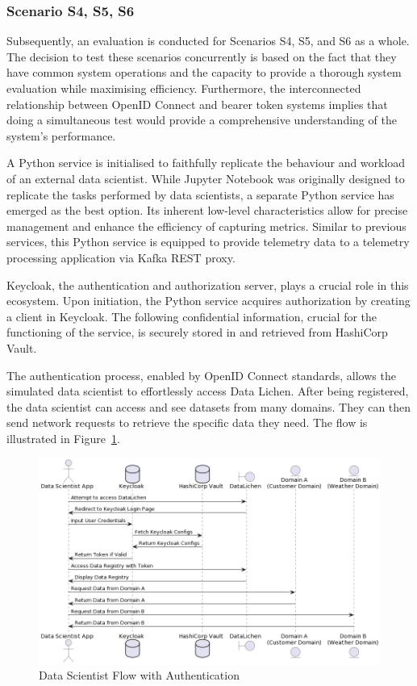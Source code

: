\documentclass[journal]{IEEEtran}
\begin{document}
\subsubsection{Scenario S4, S5, S6}

Subsequently, an evaluation is conducted for Scenarios S4, S5, and S6 as a whole. The decision to test these scenarios concurrently is based on the fact that they have common system operations and the capacity to provide a thorough system evaluation while maximising efficiency. Furthermore, the interconnected relationship between OpenID Connect and bearer token systems implies that doing a simultaneous test would provide a comprehensive understanding of the system's performance.

A Python service is initialised to faithfully replicate the behaviour and workload of an external data scientist. While Jupyter Notebook was originally designed to replicate the tasks performed by data scientists, a separate Python service has emerged as the best option. Its inherent low-level characteristics allow for precise management and enhance the efficiency of capturing metrics. Similar to previous services, this Python service is equipped to provide telemetry data to a telemetry processing application via Kafka REST proxy. 

Keycloak, the authentication and authorization server, plays a crucial role in this ecosystem. Upon initiation, the Python service acquires authorization by creating a client in Keycloak. The following confidential information, crucial for the functioning of the service, is securely stored in and retrieved from HashiCorp Vault. 

The authentication process, enabled by OpenID Connect standards, allows the simulated data scientist to effortlessly access Data Lichen. After being registered, the data scientist can access and see datasets from many domains. They can then send network requests to retrieve the specific data they need. The flow is illustrated in Figure~\ref{dataScientistFlowWithAuthentication}.


\begin{figure}[h]
  \centering
  \includegraphics[width=\textwidth]{images/data-scientist-data-lichen-flow-with-authentication.jpg}
  \caption{Data Scientist Flow with Authentication}
  \label{dataScientistFlowWithAuthentication}
\end{figure}
\end{document}

